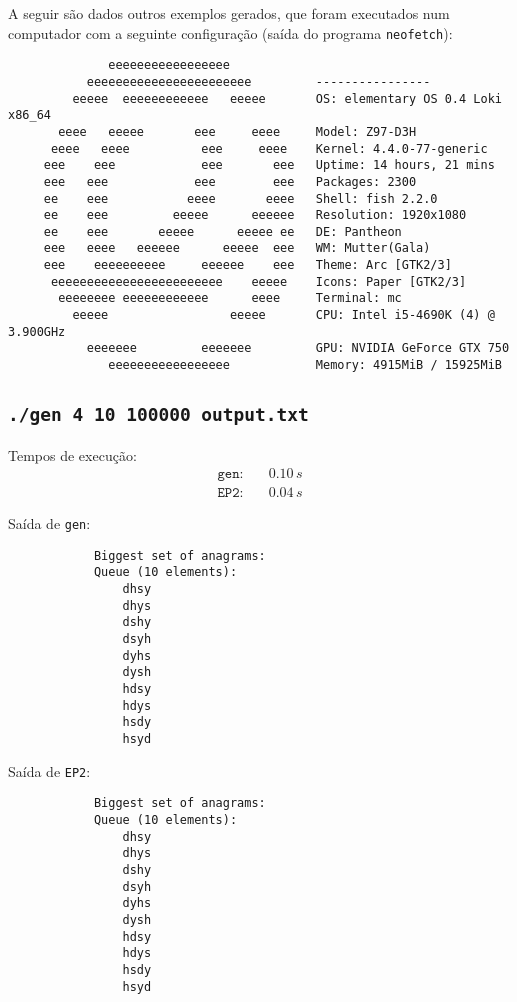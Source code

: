 \documentclass[a4paper]{article}
\newcommand{\ttt}{\texttt}
\begin{document}
    A seguir são dados outros exemplos gerados, que foram executados num computador com a seguinte configuração (saída do programa \ttt{neofetch}):
    \begin{lstlisting}
              eeeeeeeeeeeeeeeee
           eeeeeeeeeeeeeeeeeeeeeee         ----------------
         eeeee  eeeeeeeeeeee   eeeee       OS: elementary OS 0.4 Loki x86_64
       eeee   eeeee       eee     eeee     Model: Z97-D3H
      eeee   eeee          eee     eeee    Kernel: 4.4.0-77-generic
     eee    eee            eee       eee   Uptime: 14 hours, 21 mins
     eee   eee            eee        eee   Packages: 2300
     ee    eee           eeee       eeee   Shell: fish 2.2.0
     ee    eee         eeeee      eeeeee   Resolution: 1920x1080
     ee    eee       eeeee      eeeee ee   DE: Pantheon
     eee   eeee   eeeeee      eeeee  eee   WM: Mutter(Gala)
     eee    eeeeeeeeee     eeeeee    eee   Theme: Arc [GTK2/3]
      eeeeeeeeeeeeeeeeeeeeeeee    eeeee    Icons: Paper [GTK2/3]
       eeeeeeee eeeeeeeeeeee      eeee     Terminal: mc
         eeeee                 eeeee       CPU: Intel i5-4690K (4) @ 3.900GHz
           eeeeeee         eeeeeee         GPU: NVIDIA GeForce GTX 750
              eeeeeeeeeeeeeeeee            Memory: 4915MiB / 15925MiB
    \end{lstlisting}

    \newpage
    \subsection{\tt ./gen 4 10 100000 output.txt}
        Tempos de execução:
        \begin{align*}
            \ttt{gen:}\quad &0.10\, s\\
            \ttt{EP2:}\quad &0.04\, s
        \end{align*}

        Saída de \ttt{gen}:
        \begin{lstlisting}
            Biggest set of anagrams:
            Queue (10 elements):
                dhsy
                dhys
                dshy
                dsyh
                dyhs
                dysh
                hdsy
                hdys
                hsdy
                hsyd
        \end{lstlisting}

        Saída de \ttt{EP2}:
        \begin{lstlisting}
            Biggest set of anagrams:
            Queue (10 elements):
                dhsy
                dhys
                dshy
                dsyh
                dyhs
                dysh
                hdsy
                hdys
                hsdy
                hsyd
        \end{lstlisting}
\end{document}
